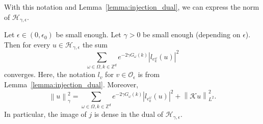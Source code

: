 \documentclass[AHL,Unicode,longabstracts,published]{cedram}
\newcommand{\n}[1]{\left\|#1\right\|}
\newcommand{\va}[1]{\left|#1\right|}
\newcommand{\clO}{\mathcal{O}}
\newcommand{\clH}{\mathcal{H}}
\newcommand{\clK}{\mathcal{K}}
\newcommand{\bbZ}{\mathbb{Z}}
\newcommand{\clO}{\mathcal{O}}
\begin{document}
With this notation and Lemma~\ref{lemma:injection_dual}, we can express the norm of $\clH_{\gamma,\epsilon}$.

\begin{lemm}\label{lemma:expression_norm}
Let $\epsilon \in (0,\epsilon_0)$ be small enough. Let $\gamma > 0$ be small enough (depending on $\epsilon$). Then for every $u \in \clH_{\gamma,\epsilon}$ the sum
\begin{equation}\label{eq:finite_sum}
\sum_{\omega  \in \Omega, k \in \bbZ^d} e^{-2 \gamma G_\omega(k)} \va{l_{e_k^\omega}(u)}^2
\end{equation}
converges. Here, the notation $l_v$ for $v \in \clO_\epsilon$ is from Lemma~\ref{lemma:injection_dual}. Moreover,
\begin{equation}\label{eq:expression_norm}
\n{u}_\gamma^2 = \sum_{\omega \in \Omega, k \in  \bbZ^d} e^{-2 \gamma G_\omega(k)} \va{l_{e_k^\omega}(u)}^2 + \n{\clK u}_{L^2}^2.
\end{equation}
In particular, the image of $j$ is dense in the dual of $\clH_{\gamma,\epsilon}$.
\end{lemm}
\end{document}
